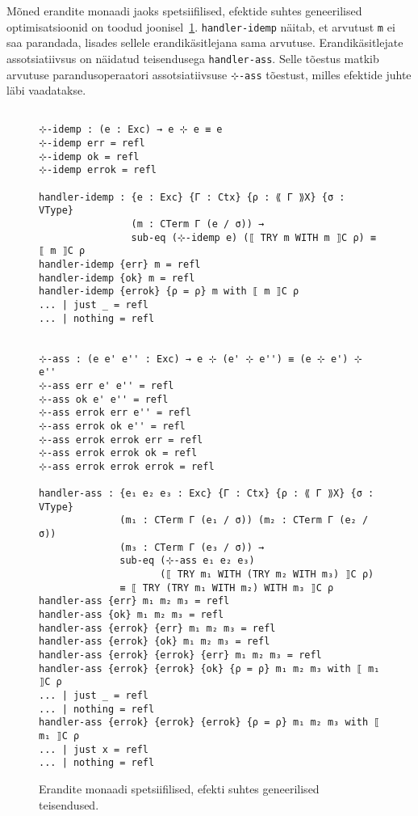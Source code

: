 \documentclass[a4paper,12pt]{article}
\begin{document}
Mõned erandite monaadi jaoks spetsiifilised, efektide suhtes geneerilised optimisatsioonid on toodud joonisel~\ref{fig:exc.opt1}.
{\tt handler-idemp} näitab, et arvutust {\tt m} ei saa parandada, lisades sellele erandikäsitlejana sama arvutuse.
Erandikäsitlejate assotsiatiivsus on näidatud teisendusega {\tt handler-ass}.
Selle tõestus matkib arvutuse parandusoperaatori assotsiatiivsuse {\tt ⊹-ass} tõestust, milles efektide juhte läbi vaadatakse.

\begin{figure}
  \begin{BVerbatim}

⊹-idemp : (e : Exc) → e ⊹ e ≡ e
⊹-idemp err = refl
⊹-idemp ok = refl
⊹-idemp errok = refl

handler-idemp : {e : Exc} {Γ : Ctx} {ρ : ⟪ Γ ⟫X} {σ : VType}
                (m : CTerm Γ (e / σ)) →
                sub-eq (⊹-idemp e) (⟦ TRY m WITH m ⟧C ρ) ≡ ⟦ m ⟧C ρ
handler-idemp {err} m = refl
handler-idemp {ok} m = refl
handler-idemp {errok} {ρ = ρ} m with ⟦ m ⟧C ρ
... | just _ = refl
... | nothing = refl


⊹-ass : (e e' e'' : Exc) → e ⊹ (e' ⊹ e'') ≡ (e ⊹ e') ⊹ e''
⊹-ass err e' e'' = refl
⊹-ass ok e' e'' = refl
⊹-ass errok err e'' = refl
⊹-ass errok ok e'' = refl
⊹-ass errok errok err = refl
⊹-ass errok errok ok = refl
⊹-ass errok errok errok = refl

handler-ass : {e₁ e₂ e₃ : Exc} {Γ : Ctx} {ρ : ⟪ Γ ⟫X} {σ : VType}
              (m₁ : CTerm Γ (e₁ / σ)) (m₂ : CTerm Γ (e₂ / σ))
              (m₃ : CTerm Γ (e₃ / σ)) →
              sub-eq (⊹-ass e₁ e₂ e₃)
                     (⟦ TRY m₁ WITH (TRY m₂ WITH m₃) ⟧C ρ)
              ≡ ⟦ TRY (TRY m₁ WITH m₂) WITH m₃ ⟧C ρ
handler-ass {err} m₁ m₂ m₃ = refl
handler-ass {ok} m₁ m₂ m₃ = refl
handler-ass {errok} {err} m₁ m₂ m₃ = refl
handler-ass {errok} {ok} m₁ m₂ m₃ = refl
handler-ass {errok} {errok} {err} m₁ m₂ m₃ = refl
handler-ass {errok} {errok} {ok} {ρ = ρ} m₁ m₂ m₃ with ⟦ m₁ ⟧C ρ
... | just _ = refl
... | nothing = refl
handler-ass {errok} {errok} {errok} {ρ = ρ} m₁ m₂ m₃ with ⟦ m₁ ⟧C ρ
... | just x = refl
... | nothing = refl
  \end{BVerbatim}
  \caption{Erandite monaadi spetsiifilised, efekti suhtes geneerilised teisendused.}
  \label{fig:exc.opt1}
\end{figure}
\end{document}

